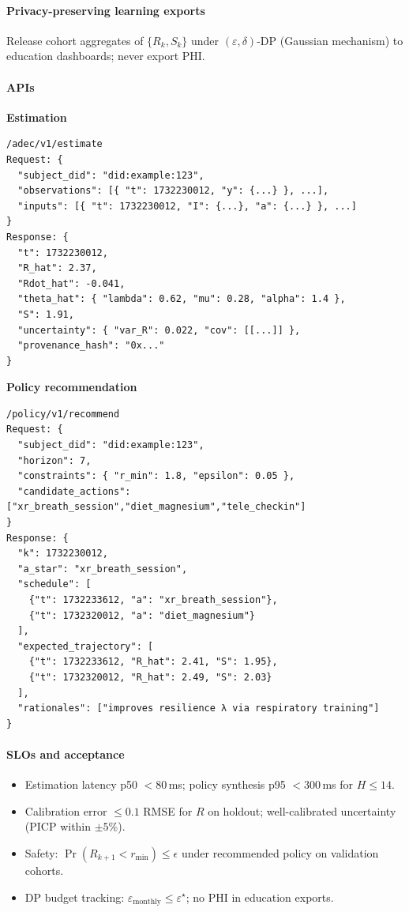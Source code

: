 \documentclass[11pt]{article}
\theoremstyle{plain}
\begin{document}
\paragraph{Privacy-preserving learning exports}
Release cohort aggregates of $\{R_k,S_k\}$ under $(\varepsilon,\delta)$-DP (Gaussian mechanism) to education dashboards; never export PHI.

\paragraph{APIs}
\noindent\textbf{Estimation}
\begin{verbatim}
/adec/v1/estimate
Request: {
  "subject_did": "did:example:123",
  "observations": [{ "t": 1732230012, "y": {...} }, ...],
  "inputs": [{ "t": 1732230012, "I": {...}, "a": {...} }, ...]
}
Response: {
  "t": 1732230012,
  "R_hat": 2.37,
  "Rdot_hat": -0.041,
  "theta_hat": { "lambda": 0.62, "mu": 0.28, "alpha": 1.4 },
  "S": 1.91,
  "uncertainty": { "var_R": 0.022, "cov": [[...]] },
  "provenance_hash": "0x..."
}
\end{verbatim}

\noindent\textbf{Policy recommendation}
\begin{verbatim}
/policy/v1/recommend
Request: {
  "subject_did": "did:example:123",
  "horizon": 7,
  "constraints": { "r_min": 1.8, "epsilon": 0.05 },
  "candidate_actions": ["xr_breath_session","diet_magnesium","tele_checkin"]
}
Response: {
  "k": 1732230012,
  "a_star": "xr_breath_session",
  "schedule": [
    {"t": 1732233612, "a": "xr_breath_session"},
    {"t": 1732320012, "a": "diet_magnesium"}
  ],
  "expected_trajectory": [
    {"t": 1732233612, "R_hat": 2.41, "S": 1.95},
    {"t": 1732320012, "R_hat": 2.49, "S": 2.03}
  ],
  "rationales": ["improves resilience λ via respiratory training"]
}
\end{verbatim}

\paragraph{SLOs and acceptance}
\begin{itemize}
  \item Estimation latency p50 $<80$\,ms; policy synthesis p95 $<300$\,ms for $H\le 14$.
  \item Calibration error $\le 0.1$ RMSE for $R$ on holdout; well-calibrated uncertainty (PICP within $\pm 5\%$).
  \item Safety: $\Pr(R_{k+1}<r_{\min})\le \epsilon$ under recommended policy on validation cohorts.
  \item DP budget tracking: $\varepsilon_{\mathrm{monthly}}\le \varepsilon^\star$; no PHI in education exports.
\end{itemize}
\end{document}
